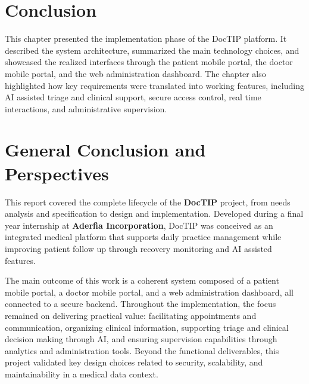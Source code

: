 \documentclass[12pt,a4paper,oneside]{report}
\begin{document}
\section*{Conclusion}
{}

This chapter presented the implementation phase of the DocTIP platform. It described the system architecture, summarized the main technology choices, and showcased the realized interfaces through the patient mobile portal, the doctor mobile portal, and the web administration dashboard. The chapter also highlighted how key requirements were translated into working features, including AI assisted triage and clinical support, secure access control, real time interactions, and administrative supervision.

\clearpage

\section*{General Conclusion and Perspectives}
{}
\label{chap:general conclusion perspectives}

This report covered the complete lifecycle of the \textbf{DocTIP} project, from needs analysis and specification to design and implementation. Developed during a final year internship at \textbf{Aderfia Incorporation}, DocTIP was conceived as an integrated medical platform that supports daily practice management while improving patient follow up through recovery monitoring and AI assisted features.

The main outcome of this work is a coherent system composed of a patient mobile portal, a doctor mobile portal, and a web administration dashboard, all connected to a secure backend. Throughout the implementation, the focus remained on delivering practical value: facilitating appointments and communication, organizing clinical information, supporting triage and clinical decision making through AI, and ensuring supervision capabilities through analytics and administration tools. Beyond the functional deliverables, this project validated key design choices related to security, scalability, and maintainability in a medical data context.
\end{document}
